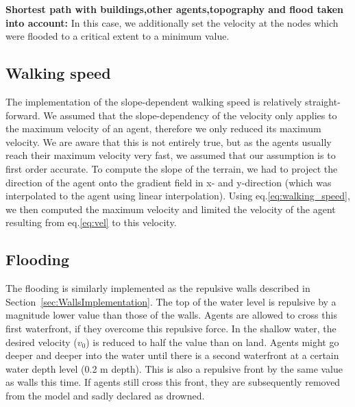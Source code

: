 \documentclass[11pt]{article}
\begin{document}
\begin{description}
\item{\textbf{Shortest path with buildings,other agents,topography and flood taken into account: }}In this case, we additionally set the velocity at the nodes which were flooded to a critical extent to a minimum value.
\end{description}

\subsection{Walking speed}
The implementation of the slope-dependent walking speed is relatively straight-forward. We assumed that the slope-dependency of the velocity only applies to the maximum velocity of an agent, therefore we only reduced its maximum velocity. We are aware that this is not entirely true, but as the agents usually reach their maximum velocity very fast, we assumed that our assumption is to first order accurate. To compute the slope of the terrain, we had to project the direction of the agent onto the gradient field in x- and y-direction (which was interpolated to the agent using linear interpolation). Using eq.\eqref{eq:walking_speed}, we then computed the maximum velocity and limited the velocity of the agent resulting from eq.\eqref{eq:vel} to this velocity.

\subsection{Flooding}

The flooding is similarly implemented as the repulsive walls described in Section~\ref{sec:WallsImplementation}. The top of the water level is repulsive by a magnitude lower value than those of the walls. Agents are allowed to cross this first waterfront, if they overcome this repulsive force. In the shallow water, the desired velocity ($v_0$) is reduced to half the value than on land. Agents might go deeper and deeper into the water until there is a second waterfront at a certain water depth level (0.2 m depth). This is also a repulsive front by the same value as walls this time. If agents still cross this front, they are subsequently removed from the model and sadly declared as drowned.
\end{document}
